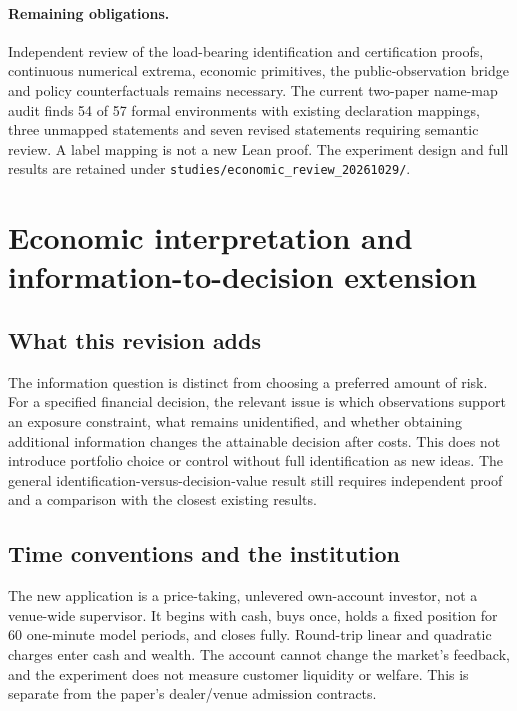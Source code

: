 \documentclass[12pt]{article}
\theoremstyle{definition}
\theoremstyle{remark}
\begin{document}
\paragraph{Remaining obligations.} Independent review of the load-bearing
identification and certification proofs, continuous numerical extrema, economic
primitives, the public-observation bridge and policy counterfactuals remains
necessary. The current two-paper name-map audit finds 54 of 57 formal environments
with existing declaration mappings, three unmapped statements and seven revised
statements requiring semantic review. A label mapping is not a new Lean proof.
The experiment design and full results are retained under
\texttt{studies/economic\_review\_20261029/}.


\section*{Economic interpretation and information-to-decision extension}

\subsection*{What this revision adds}
The information question is distinct from choosing a preferred amount of risk.
For a specified financial decision, the relevant issue is which observations
support an exposure constraint, what remains unidentified, and whether obtaining
additional information changes the attainable decision after costs. This does
not introduce portfolio choice or control without full identification as new
ideas. The general identification-versus-decision-value result still requires
independent proof and a comparison with the closest existing results.

\subsection*{Time conventions and the institution}
The new application is a price-taking, unlevered own-account investor, not a
venue-wide supervisor. It begins with cash, buys once, holds a fixed position
for 60 one-minute model periods, and closes fully. Round-trip linear and
quadratic charges enter cash and wealth. The account cannot change the market's
feedback, and the experiment does not measure customer liquidity or welfare.
This is separate from the paper's dealer/venue admission contracts.
\end{document}
